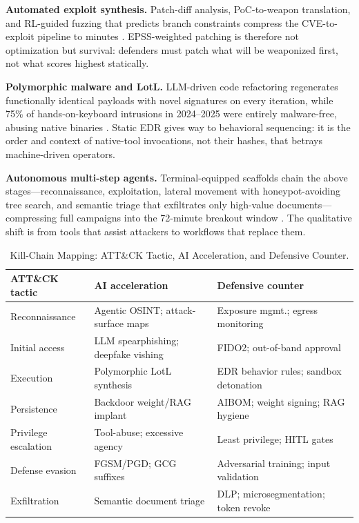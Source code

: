 \documentclass[conference,10pt,twocolumn,a4paper]{IEEEtran}
\begin{document}
\textbf{Automated exploit synthesis.} Patch-diff analysis, PoC-to-weapon translation, and RL-guided fuzzing that predicts branch constraints compress the CVE-to-exploit pipeline to minutes \cite{enisa_frontier_2026, fang2024teams}. EPSS-weighted patching is therefore not optimization but survival: defenders must patch what will be weaponized first, not what scores highest statically.

\textbf{Polymorphic malware and LotL.} LLM-driven code refactoring regenerates functionally identical payloads with novel signatures on every iteration, while 75\% of hands-on-keyboard intrusions in 2024--2025 were entirely malware-free, abusing native binaries \cite{crowdstrike_gtr_2025}. Static EDR gives way to behavioral sequencing: it is the order and context of native-tool invocations, not their hashes, that betrays machine-driven operators.

\textbf{Autonomous multi-step agents.} Terminal-equipped scaffolds chain the above stages---reconnaissance, exploitation, lateral movement with honeypot-avoiding tree search, and semantic triage that exfiltrates only high-value documents---compressing full campaigns into the 72-minute breakout window \cite{fang2024llm, fang2024teams}. The qualitative shift is from tools that assist attackers to workflows that replace them.

\begin{table}[t]
\caption{Kill-Chain Mapping: ATT\&CK Tactic, AI Acceleration, and Defensive Counter.}
\label{tab:killchain}
\centering
\footnotesize
\begin{tabular}{lll}
\toprule
\textbf{ATT\&CK tactic} & \textbf{AI acceleration} & \textbf{Defensive counter} \\
\midrule
Reconnaissance & Agentic OSINT; attack-surface maps & Exposure mgmt.; egress monitoring \\
Initial access & LLM spearphishing; deepfake vishing & FIDO2; out-of-band approval \\
Execution & Polymorphic LotL synthesis & EDR behavior rules; sandbox detonation \\
Persistence & Backdoor weight/RAG implant & AIBOM; weight signing; RAG hygiene \\
Privilege escalation & Tool-abuse; excessive agency & Least privilege; HITL gates \\
Defense evasion & FGSM/PGD; GCG suffixes & Adversarial training; input validation \\
Exfiltration & Semantic document triage & DLP; microsegmentation; token revoke \\
\bottomrule
\end{tabular}
\end{table}
\end{document}
